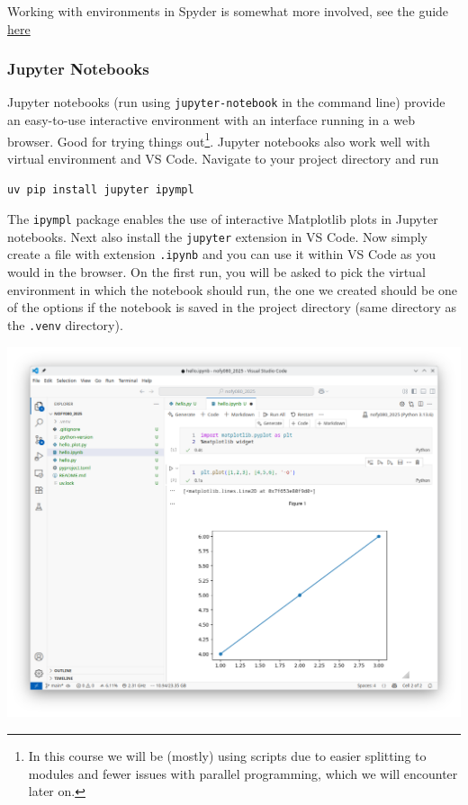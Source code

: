 \documentclass{article}
\begin{document}
Working with environments in Spyder is somewhat more involved, see the guide \href{https://github.com/spyder-ide/spyder/wiki/Working-with-packages-and-environments-in-Spyder#working-with-other-environments-and-python-installations}{here}

\subsubsection{Jupyter Notebooks}
Jupyter notebooks (run using \verb|jupyter-notebook| in the command line) provide an easy-to-use interactive environment with an interface running in a web browser. Good for trying things out\footnote{In this course we will be (mostly) using scripts due to easier splitting to modules and fewer issues with parallel programming, which we will encounter later on.}. Jupyter notebooks also work well with virtual environment and VS Code. Navigate to your project directory and run
\begin{lstlisting}
uv pip install jupyter ipympl
\end{lstlisting}
The \verb|ipympl| package enables the use of interactive Matplotlib plots in Jupyter notebooks. Next also install the \verb|jupyter| extension in VS Code. Now simply create a file with extension \verb|.ipynb| and you can use it within VS Code as you would in the browser. On the first run, you will be asked to pick the virtual environment in which the notebook should run, the one we created should be one of the options if the notebook is saved in the project directory (same directory as the \verb|.venv| directory).

\begin{center}
    \includegraphics[width=0.9\linewidth]{vscode_jupyter.png}
\end{center}
\end{document}
